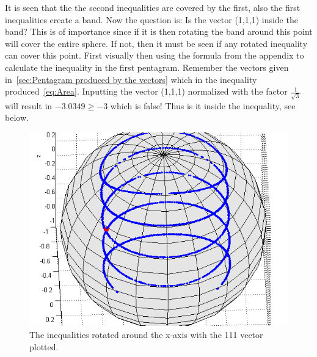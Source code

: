 It is seen that the the second inequalities are covered by the first, also the first inequalities create a band. Now the question is: Is the vector (1,1,1) inside the band? This is of importance since if it is then rotating the band around this point will cover the entire sphere. If not, then it must be seen if any rotated inequality can cover this point. First visually then using the formula from the appendix to calculate the inequality in the first pentagram. Remember the vectors given in~\ref{sec:Pentagram produced by the vectors} which in the inequality produced~\eqref{eq:Area}. Inputting the vector (1,1,1) normalized with the factor $\frac{1}{\sqrt{3}}$ will result in $-3.0349 \geq -3$ which is false! Thus is it inside the inequality, see below.
\begin{figure}[H]
\begin{center}
\includegraphics[scale=0.5]{ine12all111.png}
\caption{The inequalities rotated around the x-axis with the 111 vector plotted.}
\label{fig:ine12all111}
\end{center}
\end{figure}

